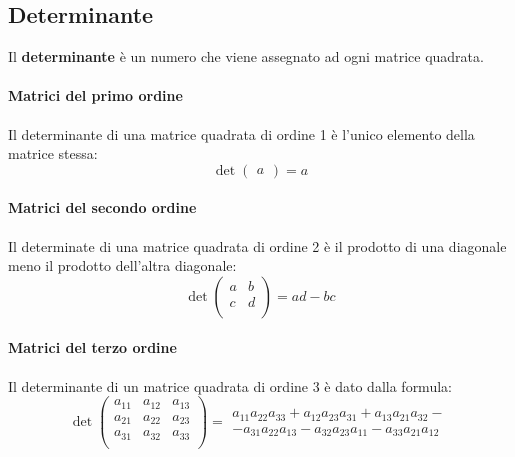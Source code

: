 \subsection{Determinante}

\begin{definition}[Determinante]
  Il \textbf{determinante} è un numero che viene assegnato ad ogni matrice quadrata.
\end{definition}

\paragraph*{Matrici del primo ordine}
Il determinante di una matrice quadrata di ordine 1 è l'unico elemento della matrice stessa:
$$\det\begin{pmatrix}a\end{pmatrix}=a$$

\paragraph*{Matrici del secondo ordine}
Il determinate di una matrice quadrata di ordine 2 è il prodotto di una diagonale meno il prodotto dell'altra diagonale:
$$
  \det
  \begin{pmatrix}
    a & b \\ 
    c & d \\
  \end{pmatrix}
  =ad-bc
$$

\paragraph*{Matrici del terzo ordine}
Il determinante di un matrice quadrata di ordine 3 è dato dalla formula:
$$
  \det
  \begin{pmatrix}
    a_{11} & a_{12} & a_{13} \\
    a_{21} & a_{22} & a_{23} \\
    a_{31} & a_{32} & a_{33} \\
  \end{pmatrix}
  =
  \begin{matrix}
    a_{11}a_{22}a_{33}+a_{12}a_{23}a_{31}+a_{13}a_{21}a_{32}- \\
    -a_{31}a_{22}a_{13}-a_{32}a_{23}a_{11}-a_{33}a_{21}a_{12}
  \end{matrix}
$$

